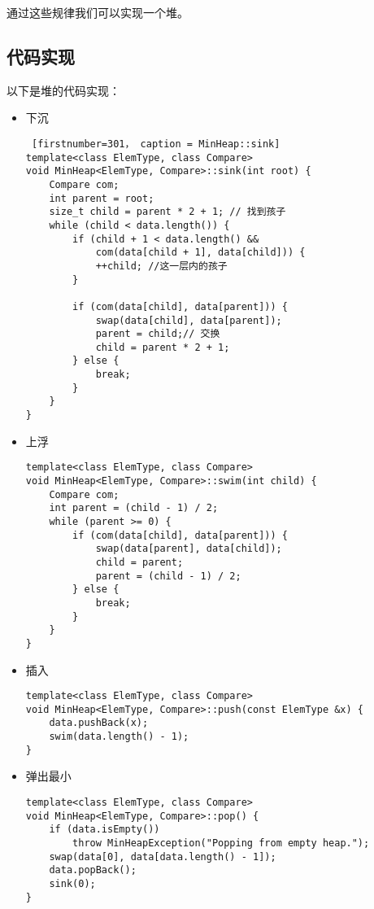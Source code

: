 {通过这些规律我们可以实现一个堆。

\subsection{代码实现}
以下是堆的代码实现：

\begin{itemize}
      \item 下沉
\begin{lstlisting} [firstnumber=301， caption = MinHeap::sink]
template<class ElemType, class Compare>
void MinHeap<ElemType, Compare>::sink(int root) {
    Compare com;
    int parent = root;
    size_t child = parent * 2 + 1; // 找到孩子
    while (child < data.length()) {
        if (child + 1 < data.length() &&
            com(data[child + 1], data[child])) {
            ++child; //这一层内的孩子
        }

        if (com(data[child], data[parent])) {
            swap(data[child], data[parent]);
            parent = child;// 交换
            child = parent * 2 + 1;
        } else {
            break;
        }
    }
}\end{lstlisting}
      \item 上浮
\begin{lstlisting}[firstnumber=322, caption=MinHeap::swim]
template<class ElemType, class Compare>
void MinHeap<ElemType, Compare>::swim(int child) {
    Compare com;
    int parent = (child - 1) / 2;
    while (parent >= 0) {
        if (com(data[child], data[parent])) {
            swap(data[parent], data[child]);
            child = parent;
            parent = (child - 1) / 2;
        } else {
            break;
        }
    }
}\end{lstlisting}

    \item 插入
\begin{lstlisting}[firstnumber=337]
template<class ElemType, class Compare>
void MinHeap<ElemType, Compare>::push(const ElemType &x) {
    data.pushBack(x);
    swim(data.length() - 1);
}\end{lstlisting}

    \item 弹出最小
\begin{lstlisting}[firstnumber=343]
template<class ElemType, class Compare>
void MinHeap<ElemType, Compare>::pop() {
    if (data.isEmpty())
        throw MinHeapException("Popping from empty heap.");
    swap(data[0], data[data.length() - 1]);
    data.popBack();
    sink(0);
}\end{lstlisting}
\end{itemize}


}
